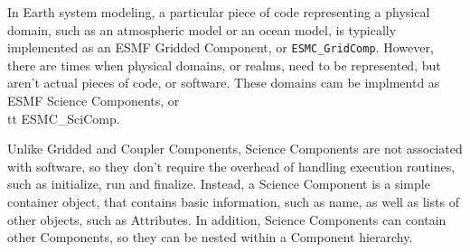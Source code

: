 %

\label{sec:SciComp}

In Earth system modeling, a particular piece of code representing a physical 
domain, such as an atmospheric model or an ocean model, is typically 
implemented as an ESMF Gridded Component, or {\tt ESMC\_GridComp}.  
However, there are times when physical domains, or realms, need to be 
represented, but aren't actual pieces of code, or software.  These domains 
cam be implmentd as ESMF Science Components, or {\\tt ESMC_SciComp}.

Unlike Gridded and Coupler Components, Science Components are not associated 
with software, so they don't require the overhead of handling execution 
routines, such as initialize, run and finalize.  Instead, a Science Component 
is a simple container object, that contains basic information, such as name,
as well as lists of other objects, such as Attributes.  In addition, Science
Components can contain other Components, so they can be nested within a
Component hierarchy.
